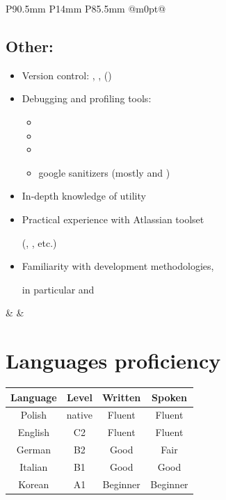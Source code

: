 \documentclass[a4paper,10pt]{article}
\begin{document}
\begin{tabular}{ P{90.5mm} P{14mm} P{85.5mm} @{}m{0pt}@{} }
\vspace{9pt}
\subsection{Other:}
\begin{itemize}[leftmargin=15pt,itemsep=3pt]
  \item Version control: , ,  ()
  \item Debugging and profiling tools:
  \begin{itemize}
    \item {}
    \item {}
    \item {}
    \item google sanitizers (mostly  and )
  \end{itemize}
  \item In-depth knowledge of  utility
  \item Practical experience with Atlassian toolset\par
    (, , etc.)\par
  \item Familiarity with  development methodologies,\par
    in particular  and 
\end{itemize}

& &

\section{Languages proficiency}
\hspace{7mm}\begin{tabular}{|c|c|c|c|}
\hline
\textbf{Language} & \textbf{Level} & \textbf{Written} & \textbf{Spoken} \\
\hline
Polish & native & Fluent & Fluent \\
\hline
English & C2 & Fluent & Fluent \\
\hline
German & B2 & Good & Fair \\
\hline
Italian & B1 & Good & Good \\
\hline
Korean & A1 & Beginner & Beginner \\
\hline
\end{tabular}

\vspace{24pt}

\end{tabular}
\end{document}
